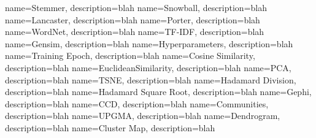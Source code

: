 {
name={Stemmer},
description={blah} 
}
{
name={Snowball},
description={blah} 
}
{
name={Lancaster},
description={blah} 
}
{
name={Porter},
description={blah} 
}
{
name={WordNet},
description={blah} 
}
{
name={TF-IDF},
description={blah} 
}
{
name={Gensim},
description={blah} 
}
{
name={Hyperparameters},
description={blah} 
}
{
name={Training  Epoch},
description={blah} 
}
{
name={Cosine Similarity},
description={blah} 
}
{
name={EuclideanSimilarity},
description={blah} 
}
{
name={PCA},
description={blah} 
}
{
name={TSNE},
description={blah} 
}
{
name={Hadamard Division},
description={blah} 
}
{
name={Hadamard Square Root},
description={blah} 
}
{
name={Gephi},
description={blah} 
}
{
name={CCD},
description={blah} 
}
{
name={Communities},
description={blah} 
}
{
name={UPGMA},
description={blah} 
}
{
name={Dendrogram},
description={blah} 
}
{
name={Cluster Map},
description={blah} 
}